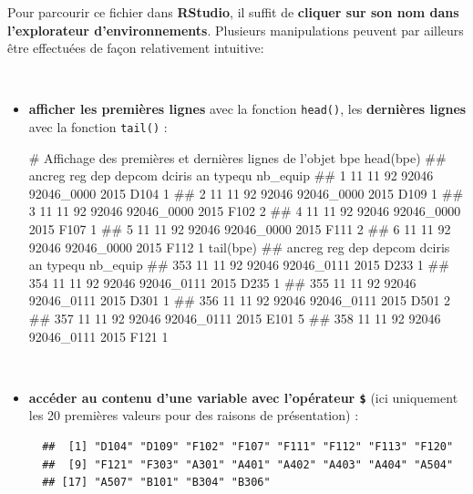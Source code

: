 \documentclass[12pt,twosided, notitlepage]{book}
\newenvironment{Shaded}{}{}
\newcommand{\CommentTok}[1]{\textcolor[rgb]{0.00,0.50,0.00}{#1}}
\newcommand{\KeywordTok}[1]{\textcolor[rgb]{0.00,0.00,1.00}{#1}}
\newcommand{\NormalTok}[1]{#1}
\newcommand{\OperatorTok}[1]{#1}
\renewenvironment{Shaded}{\begin{snugshade}}{\end{snugshade}}
\begin{document}
Pour parcourir ce fichier dans \textbf{RStudio}, il suffit de
\textbf{cliquer sur son nom dans l'explorateur d'environnements}.
Plusieurs manipulations peuvent par ailleurs être effectuées de façon
relativement intuitive:

~

\begin{itemize}
\item
  \textbf{afficher les premières lignes} avec la fonction
  \texttt{head()}, les \textbf{dernières lignes} avec la fonction
  \texttt{tail()}
  :

\begin{Shaded}
\begin{Highlighting}[]
\CommentTok{# Affichage des premières et dernières lignes de l'objet bpe}
\KeywordTok{head}\NormalTok{(bpe)}
\NormalTok{  ##   ancreg reg dep depcom     dciris   an typequ nb_equip}
\NormalTok{  ## 1     11  11  92  92046 92046_0000 2015   D104        1}
\NormalTok{  ## 2     11  11  92  92046 92046_0000 2015   D109        1}
\NormalTok{  ## 3     11  11  92  92046 92046_0000 2015   F102        2}
\NormalTok{  ## 4     11  11  92  92046 92046_0000 2015   F107        1}
\NormalTok{  ## 5     11  11  92  92046 92046_0000 2015   F111        2}
\NormalTok{  ## 6     11  11  92  92046 92046_0000 2015   F112        1}
\KeywordTok{tail}\NormalTok{(bpe)}
\NormalTok{  ##     ancreg reg dep depcom     dciris   an typequ nb_equip}
\NormalTok{  ## 353     11  11  92  92046 92046_0111 2015   D233        1}
\NormalTok{  ## 354     11  11  92  92046 92046_0111 2015   D235        1}
\NormalTok{  ## 355     11  11  92  92046 92046_0111 2015   D301        1}
\NormalTok{  ## 356     11  11  92  92046 92046_0111 2015   D501        2}
\NormalTok{  ## 357     11  11  92  92046 92046_0111 2015   E101        5}
\NormalTok{  ## 358     11  11  92  92046 92046_0111 2015   F121        1}
\end{Highlighting}
\end{Shaded}
\end{itemize}

~

\begin{itemize}
\item
  \textbf{accéder au contenu d'une variable avec l'opérateur
  \texttt{\$}}\index{\texttt{\$}} (ici uniquement les 20 premières
  valeurs pour des raisons de présentation) :

\begin{Shaded}
\end{Shaded}

\begin{verbatim}
  ##  [1] "D104" "D109" "F102" "F107" "F111" "F112" "F113" "F120"
  ##  [9] "F121" "F303" "A301" "A401" "A402" "A403" "A404" "A504"
  ## [17] "A507" "B101" "B304" "B306"
\end{verbatim}
\end{itemize}
\end{document}
